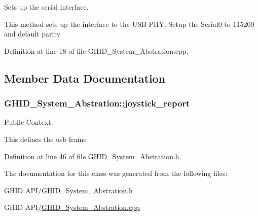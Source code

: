 \-Sets up the serial interface. 

\-This method sets up the interface to the \-U\-S\-B \-P\-H\-Y. \-Setup the \-Serial0 to 115200 and default parity 

\-Definition at line 18 of file \-G\-H\-I\-D\-\_\-\-System\-\_\-\-Abstration.\-cpp.



\subsection{\-Member \-Data \-Documentation}
\hypertarget{class_g_h_i_d___system___abstration_a7b6a61d7f6516c004300bccae5145ca4}{
\subsubsection[{joystick\-\_\-report}]{ {\bf \-G\-H\-I\-D\-\_\-\-System\-\_\-\-Abstration\-::joystick\-\_\-report}}}\label{class_g_h_i_d___system___abstration_a7b6a61d7f6516c004300bccae5145ca4}


\-Public \-Context. 

\-This defines the usb frame 

\-Definition at line 46 of file \-G\-H\-I\-D\-\_\-\-System\-\_\-\-Abstration.\-h.



\-The documentation for this class was generated from the following files\-:\begin{DoxyCompactItemize}
\item 
\-G\-H\-I\-D A\-P\-I/\hyperlink{_g_h_i_d___system___abstration_8h}{\-G\-H\-I\-D\-\_\-\-System\-\_\-\-Abstration.\-h}\item 
\-G\-H\-I\-D A\-P\-I/\hyperlink{_g_h_i_d___system___abstration_8cpp}{\-G\-H\-I\-D\-\_\-\-System\-\_\-\-Abstration.\-cpp}\end{DoxyCompactItemize}
